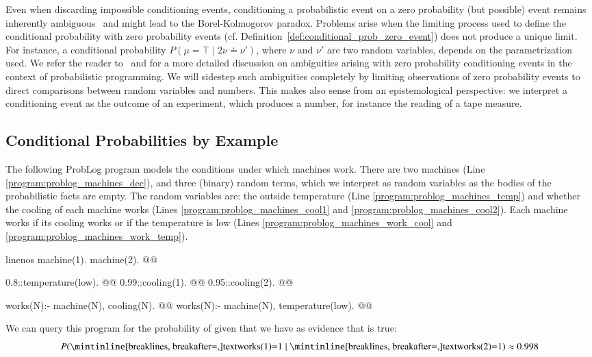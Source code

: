 Even when discarding impossible conditioning events, conditioning a probabilistic event on a zero probability (but possible) event remains inherently ambiguous~\citep{jaynes2003probability} and might lead to the Borel-Kolmogorov paradox.
Problems arise when the limiting process used to define the conditional probability with zero probability events (cf. Definition~\ref{def:conditional_prob_zero_event}) does not produce a unique limit. 
For instance, a conditional probability  $P(\mu=\top \mid  2\nu \doteq \nu' )$, where $\nu$ and $\nu'$ are two random variables, depends on the parametrization used. We refer the reader to~\citep{shan2017exact} and \citep{jacobs2021paradoxes} for a more detailed discussion on ambiguities arising with zero probability conditioning events in the context of probabilistic programming.
We will sidestep such ambiguities completely by limiting observations of zero probability events to direct comparisons between random variables and numbers. This makes also sense from an epistemological perspective: we interpret a conditioning event as the outcome of an experiment, which produces a number, for instance the reading of a tape measure.






\subsection{Conditional Probabilities by Example}



\begin{example}\label{example:problog_machine}
The following ProbLog program models the conditions under which machines work. There are two machines (Line \ref{program:problog_machines_dec}), and three (binary) random terms, which we interpret as random variables as the bodies of the probabilistic facts are empty. The random variables are: the outside temperature (Line \ref{program:problog_machines_temp}) and  whether the cooling of each machine works (Lines \ref{program:problog_machines_cool1} and \ref{program:problog_machines_cool2}). Each machine works if its cooling works or if the temperature is low (Lines \ref{program:problog_machines_work_cool} and \ref{program:problog_machines_work_temp}).


	\begin{problog*}{linenos}
machine(1). machine(2). @\label{program:problog_machines_dec}@

0.8::temperature(low). @\label{program:problog_machines_temp}@
0.99::cooling(1). @\label{program:problog_machines_cool1}@
0.95::cooling(2). @\label{program:problog_machines_cool2}@

works(N):- machine(N), cooling(N). @\label{program:problog_machines_work_cool}@
works(N):- machine(N), temperature(low). @\label{program:problog_machines_work_temp}@
	\end{problog*}
We can query this program for the probability of  given that we have as evidence that  is true:
$$
P(\text{\dcplpinline{works(1)}}{=}1\mid\text{\dcplpinline{works(2)}}{=}1)\approx 0.998
$$
\end{example}


